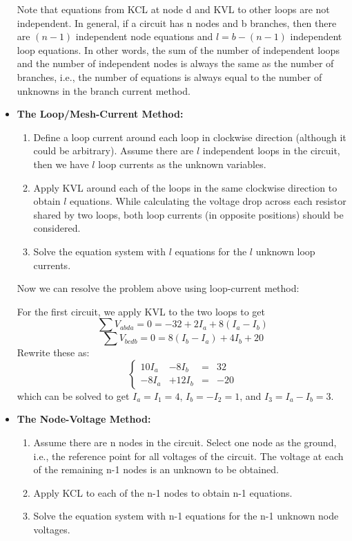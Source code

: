 \begin{itemize}
  Note that equations from KCL at node d and KVL to other loops are not
  independent. In general, if a circuit has n nodes and b branches, then
  there are $(n-1)$ independent node equations and $l=b-(n-1)$ independent 
  loop equations. In other words, the sum of the number of independent loops
  and the number of independent nodes is always the same as the number of 
  branches, i.e., the number of equations is always equal to the number of 
  unknowns in the branch current method.

\item {\bf The Loop/Mesh-Current Method:}
  \begin{enumerate} 
  \item Define a loop current around each loop in clockwise direction
    (although it could be arbitrary). Assume there are $l$ independent
    loops in the circuit, then we have $l$ loop currents as the unknown
    variables.
  \item Apply KVL around each of the loops in the same clockwise 
    direction to obtain $l$ equations. While calculating the voltage 
    drop across each resistor shared by two loops, both loop currents 
    (in opposite positions) should be considered.
  \item Solve the equation system with $l$ equations for the $l$ unknown
    loop currents.
  \end{enumerate}
  
  Now we can resolve the problem above using loop-current method:


  For the first circuit, we apply KVL to the two loops to get
  \[	\sum V_{abda} =0=-32+2I_a+8(I_a-I_b) \]
  \[	\sum V_{bcdb} =0=8(I_b-I_a)+4I_b+20  \]
  Rewrite these as:
  \[ \left\{ \begin{array}{rrrr} 10I_a&-8I_b&=&32 \\ -8I_a &+12I_b&=&-20
  \end{array} \right. \]
  which can be solved to get $I_a=I_1=4$, $I_b=-I_2=1$, and $I_3=I_a-I_b=3$.

\item {\bf The Node-Voltage Method:}
  \begin{enumerate} 
  \item Assume there are n nodes in the circuit. Select one node as
    the ground, i.e., the reference point for all voltages of the circuit.
    The voltage at each of the remaining n-1 nodes is an unknown to be 
    obtained.
  \item Apply KCL to each of the n-1 nodes to obtain n-1 equations. 
  \item Solve the equation system with n-1 equations for the n-1 unknown
    node voltages.
  \end{enumerate}


\end{itemize}
